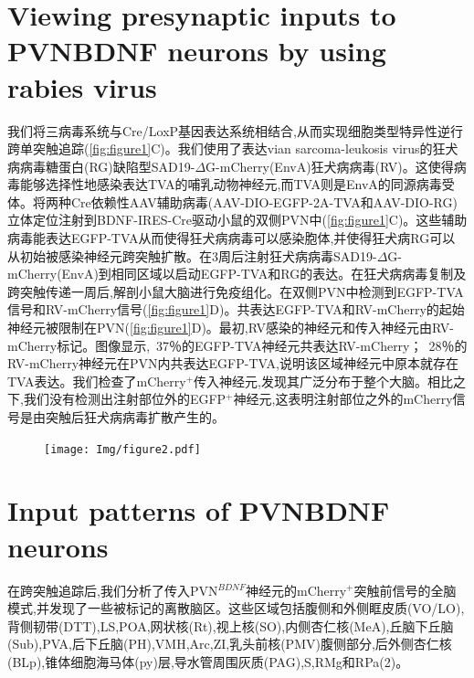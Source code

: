 \section{Viewing presynaptic inputs to PVNBDNF neurons by using rabies virus}
我们将三病毒系统与Cre/LoxP基因表达系统\citep{wickersham2007monosynaptic}相结合,从而实现细胞类型特异性逆行跨单突触追踪(\figurename{\ref{fig:figure1}C})。我们使用了表达vian sarcoma-leukosis virus的狂犬病病毒糖蛋白(RG)缺陷型SAD19-$\Delta$G-mCherry(EnvA)狂犬病病毒(RV)。这使得病毒能够选择性地感染表达TVA的哺乳动物神经元,而TVA则是EnvA的同源病毒受体。将两种Cre依赖性AAV辅助病毒(AAV-DIO-EGFP-2A-TVA和AAV-DIO-RG)立体定位注射到BDNF-IRES-Cre驱动小鼠的双侧PVN中(\figurename{\ref{fig:figure1}C})。这些辅助病毒能表达EGFP-TVA从而使得狂犬病病毒可以感染胞体,并使得狂犬病RG可以从初始被感染神经元跨突触扩散。在3周后注射狂犬病病毒SAD19-$\Delta$G-mCherry(EnvA)到相同区域以启动EGFP-TVA和RG的表达。在狂犬病病毒复制及跨突触传递一周后,解剖小鼠大脑进行免疫组化。在双侧PVN中检测到EGFP-TVA信号和RV-mCherry信号(\figurename{\ref{fig:figure1}D})。共表达EGFP-TVA和RV-mCherry的起始神经元被限制在PVN(\figurename{\ref{fig:figure1}D})。最初,RV感染的神经元和传入神经元由RV-mCherry标记。图像显示,~37％的EGFP-TVA神经元共表达RV-mCherry；~28％的RV-mCherry神经元在PVN内共表达EGFP-TVA,说明该区域神经元中原本就存在TVA表达。我们检查了mCherry$^{+}$传入神经元,发现其广泛分布于整个大脑。相比之下,我们没有检测出注射部位外的EGFP$^{+}$神经元,这表明注射部位之外的mCherry信号是由突触后狂犬病病毒扩散产生的。

\begin{figure}[!htbp]
    \centering
    \texttt{[image: Img/figure2.pdf]}
    \label{fig:figure2}
\end{figure}


\section{Input patterns of PVNBDNF neurons}
在跨突触追踪后,我们分析了传入PVN$^{BDNF}$神经元的mCherry$^{+}$突触前信号的全脑模式,并发现了一些被标记的离散脑区。这些区域包括腹侧和外侧眶皮质(VO/LO),背侧韧带(DTT),LS,POA,网状核(Rt),视上核(SO),内侧杏仁核(MeA),丘脑下丘脑(Sub),PVA,后下丘脑(PH),VMH,Arc,ZI,乳头前核(PMV)腹侧部分,后外侧杏仁核(BLp),锥体细胞海马体(py)层,导水管周围灰质(PAG),S,RMg和RPa(\figurename{2})。

